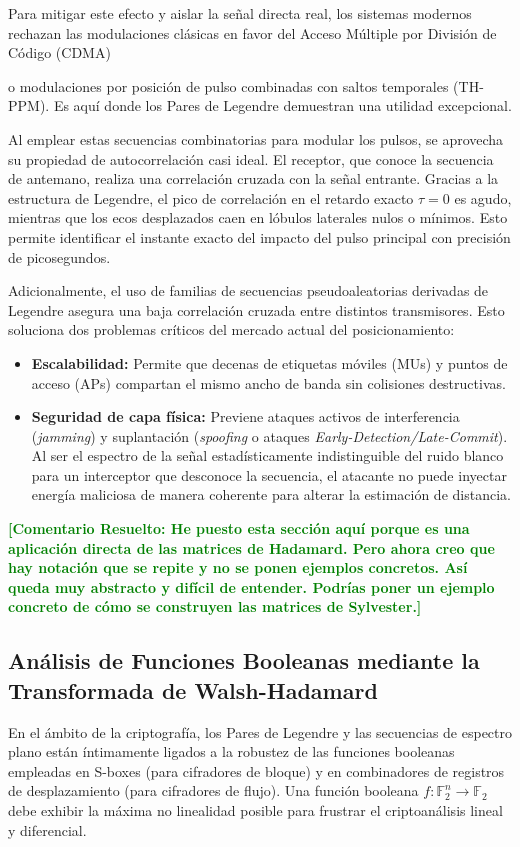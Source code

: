 \documentclass[12pt,a4paper]{tfg_domingo}
\newcommand{\ComentarioR}[1]{\textcolor{green}{\textbf{[Comentario Resuelto:
#1]}}}
\begin{document}
Para mitigar este efecto y aislar la señal directa real, los sistemas
modernos rechazan las modulaciones clásicas en favor del Acceso
Múltiple por División de Código (CDMA)


o modulaciones por posición de pulso combinadas con saltos temporales (TH-PPM). Es aquí donde los Pares de Legendre demuestran una utilidad excepcional. 

Al emplear estas secuencias combinatorias para modular los pulsos, se aprovecha su propiedad de autocorrelación casi ideal. El receptor, que conoce la secuencia de antemano, realiza una correlación cruzada con la señal entrante. Gracias a la estructura de Legendre, el pico de correlación en el retardo exacto $\tau = 0$ es agudo, mientras que los ecos desplazados caen en lóbulos laterales nulos o mínimos. Esto permite identificar el instante exacto del impacto del pulso principal con precisión de picosegundos.

Adicionalmente, el uso de familias de secuencias pseudoaleatorias derivadas de Legendre asegura una baja correlación cruzada entre distintos transmisores. Esto soluciona dos problemas críticos del mercado actual del posicionamiento: 
\begin{itemize}
    \item \textbf{Escalabilidad:} Permite que decenas de etiquetas móviles (MUs) y puntos de acceso (APs) compartan el mismo ancho de banda sin colisiones destructivas.
    \item \textbf{Seguridad de capa física:} Previene ataques activos de interferencia (\emph{jamming}) y suplantación (\emph{spoofing} o ataques \emph{Early-Detection/Late-Commit}). Al ser el espectro de la señal estadísticamente indistinguible del ruido blanco para un interceptor que desconoce la secuencia, el atacante no puede inyectar energía maliciosa de manera coherente para alterar la estimación de distancia.
    \end{itemize}

    \ComentarioR{He puesto esta sección aquí porque es una aplicación
      directa de las matrices de Hadamard. Pero ahora creo que hay
      notación que se repite y no se ponen ejemplos concretos. Así
      queda muy abstracto y difícil de entender. Podrías poner un
      ejemplo concreto de cómo se construyen las matrices de Sylvester.}
\subsection{Análisis de Funciones Booleanas mediante la Transformada de Walsh-Hadamard}
En el ámbito de la criptografía, los Pares de Legendre y las secuencias de espectro plano están íntimamente ligados a la robustez de las funciones booleanas empleadas en S-boxes (para cifradores de bloque) y en combinadores de registros de desplazamiento (para cifradores de flujo). Una función booleana $f: \mathbb{F}_2^n \to \mathbb{F}_2$ debe exhibir la máxima no linealidad posible para frustrar el criptoanálisis lineal y diferencial.
\end{document}
